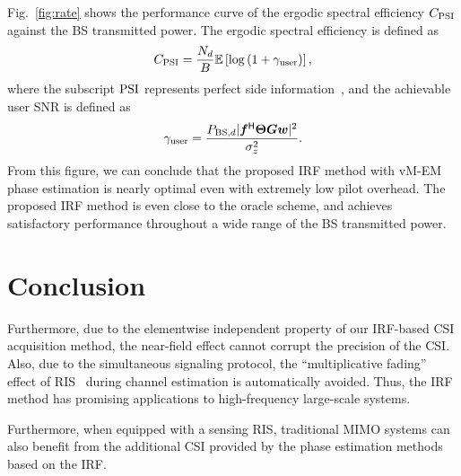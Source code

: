 \documentclass[journal,twocolumn]{IEEEtran}
\theoremstyle{nonumberplain}
\def \H {^{\mathsf{H}}}
\newcommand{\red}[1]{{\color{red}{#1}}}
\begin{document}
{    Fig.~\ref{fig:rate} shows the performance curve of the ergodic spectral efficiency $C_{\rm PSI}$ against the BS transmitted power. The ergodic spectral efficiency is defined as 
    \begin{equation}
        C_{\rm PSI} = \frac{N_d}{B} \mathbb{E}\left[\log\left( 1+\gamma_{\rm user} \right)\right], \label{eqn:capacity_def}
    \end{equation} 
    where the subscript ${\rm PSI}$ represents perfect side information~\cite{lapidoth2002fading}, and the achievable user SNR is defined as 
    \begin{equation}
        \gamma_{\rm user} = \frac{P_{{\rm BS}, d} |{\bm f}\H {\bm \Theta} {\bm G}{\bm w}|^2}{\sigma_z^2}.
    \end{equation}
    From this figure, we can conclude that the proposed IRF method with vM-EM phase estimation is nearly optimal even with extremely low pilot overhead. The proposed IRF method is even close to the oracle scheme, and achieves satisfactory performance throughout a wide range of the BS transmitted power. 
    }

\section{Conclusion}
\label{Conclusion}
    \red{In this paper, we have introduced a dimension-independent CSI acquisition method for sensing RIS-assisted MISO wireless communication systems. 
    Combined with our proposed vM-EM phase estimation algorithm, the pilot overhead of our CSI acquisition method is made independent of the number of RIS elements with low computational cost, enabling the implementation of extremely large-scale RISs to achieve significant beamforming gain. 
    Theoretical analysis have demonstrated the asymptotic optimality of the proposed vM-EM algorithm, which is further supported by the CRLB analysis.  Simulation results have also verified the near-optimality of our vM-EM algorithm. }
    Furthermore, due to the elementwise independent property of our \ac{IRF}-based CSI acquisition method, the near-field effect cannot corrupt the precision of the CSI. 
    Also, due to the simultaneous signaling protocol, the ``multiplicative fading'' effect of RIS~\cite{zhang2021active,liu2021active} during channel estimation is automatically avoided. 
    Thus, the \ac{IRF} method has promising applications to high-frequency large-scale systems. 
    
    \red{For future work, the spatial interferential fringes on the sensing RIS may be exploited to recover the CSI at higher precision, and the data obtained by the power sensors may be utilized to perform joint channel estimation and beamforming with sparse assumptions on the channel. 
    In addition, different interferential frequencies can be assigned to different users to perform multi-user CSI acquisition simultaneously, but the waveforms should be re-designed to avoid interference among users. }
    Furthermore, when equipped with a sensing RIS, traditional MIMO systems can also benefit from the additional CSI provided by the phase estimation methods based on the IRF.  
\end{document}
